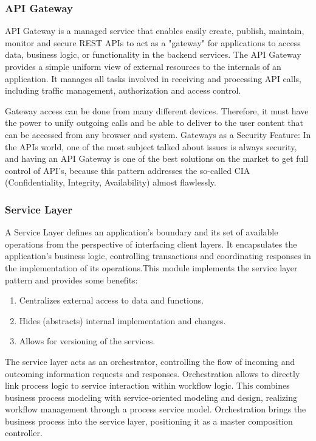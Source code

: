 \subsubsection{API Gateway}\label{sec:APIGateway}
API Gateway is a managed service that enables easily create, publish, maintain, monitor and secure REST APIs to act as a "gateway" for applications to access data, business logic, or functionality in the backend services. The API Gateway provides a simple uniform view of external resources to the internals of an application. It manages all tasks involved in receiving and processing API calls, including traffic management, authorization and access control.

Gateway access can be done from many different devices. Therefore, it must have the power to unify outgoing calls and be able to deliver to the user content that can be accessed from any browser and system. Gateways as a Security Feature: In the APIs world, one of the most subject talked about issues is always security, and having an API Gateway is one of the best solutions on the market to get full control of API’s, because this pattern addresses the so-called CIA (Confidentiality, Integrity, Availability) almost flawlessly.

\subsubsection{Service Layer}\label{sec:ServiceLayer}
A Service Layer defines an application's boundary and its set of available operations from the perspective of interfacing client layers. It encapsulates the application's business logic, controlling transactions and coordinating responses in the implementation of its operations.This module implements the service layer pattern and provides some benefits:

\begin{enumerate}
\item Centralizes external access to data and functions.
\item Hides (abstracts) internal implementation and changes.
\item Allows for versioning of the services.
\end{enumerate}

The service layer acts as an orchestrator, controlling the flow of incoming and outcoming information requests and responses. Orchestration allows to directly link process logic to service interaction within workflow logic. This combines business process modeling with service-oriented modeling and design, realizing workflow management through a process service model. Orchestration brings the business process into the service layer, positioning it as a master composition controller.

